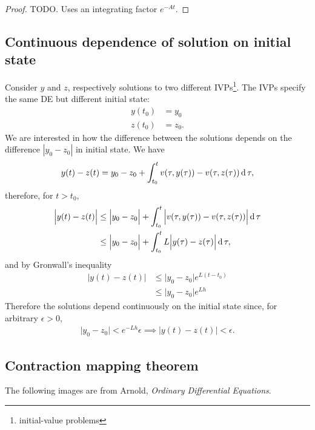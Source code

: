 \begin{proof}
TODO. Uses an integrating factor $e^{-At}$.
\end{proof}

\subsection{Continuous dependence of solution on initial state}
Consider $y$ and $z$, respectively solutions to two different
IVPs\footnote{initial-value problems}. The IVPs specify the same DE but
different initial state:
\begin{align*}
  y(t_0) &= y_0\\
  z(t_0) &= z_0.
\end{align*}
We are interested in how the difference between the solutions depends on the
difference $|y_0 - z_0|$ in initial state. We have
\begin{align*}
  y(t) - z(t) = y_0 - z_0 +
                \int_{t_0}^t v(\tau, y(\tau)) - v(\tau, z(\tau)) \operatorname{\text{d}}\tau,
\end{align*}
therefore, for $t > t_0$,
\begin{align*}
  \Big|y(t) - z(t)\Big| &\leq \Big|y_0 - z_0\Big| +
                              \int_{t_0}^t \Big|v(\tau, y(\tau)) - v(\tau, z(\tau))\Big| \operatorname{\text{d}}\tau\\
                        &\leq \Big|y_0 - z_0\Big| +
                              \int_{t_0}^t L\Big|y(\tau) - z(\tau)\Big| \operatorname{\text{d}}\tau,
\end{align*}
and by Gronwall's inequality
\begin{align*}
  \Big|y(t) - z(t)\Big| &\leq \Big|y_0 - z_0\Big|e^{L(t - t_0)}\\
                        &\leq \Big|y_0 - z_0\Big|e^{Lh}
\end{align*}
Therefore the solutions depend continuously on the initial state since, for
arbitrary $\epsilon > 0$,
\begin{align*}
  \Big|y_0 - z_0\Big| < e^{-Lh}\epsilon \implies \Big|y(t) - z(t)\Big| < \epsilon.
\end{align*}


\subsection{Contraction mapping theorem}
The following images are from Arnold, \textit{Ordinary Differential Equations}.\\

